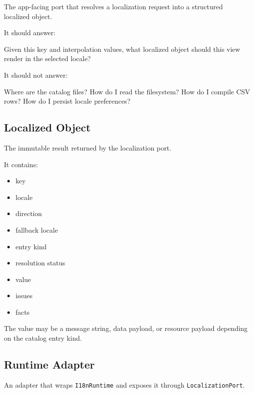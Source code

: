 The app-facing port that resolves a localization request into a structured localized object.

It should answer:

\begin{CodeBlock}
Given this key and interpolation values, what localized object should this view
render in the selected locale?
\end{CodeBlock}

It should not answer:

\begin{CodeBlock}
Where are the catalog files?
How do I read the filesystem?
How do I compile CSV rows?
How do I persist locale preferences?
\end{CodeBlock}

\subsection{Localized Object}\label{record-195-localized-object}

The immutable result returned by the localization port.

It contains:

\begin{itemize}
\tightlist
\item
  key
\item
  locale
\item
  direction
\item
  fallback locale
\item
  entry kind
\item
  resolution status
\item
  value
\item
  issues
\item
  facts
\end{itemize}

The value may be a message string, data payload, or resource payload depending on the catalog entry kind.

\subsection{Runtime Adapter}\label{record-195-runtime-adapter}

An adapter that wraps \texttt{I\allowbreak{}1\allowbreak{}8\allowbreak{}n\allowbreak{}R\allowbreak{}u\allowbreak{}n\allowbreak{}t\allowbreak{}i\allowbreak{}m\allowbreak{}e} and exposes it through \texttt{L\allowbreak{}o\allowbreak{}c\allowbreak{}a\allowbreak{}l\allowbreak{}i\allowbreak{}z\allowbreak{}a\allowbreak{}t\allowbreak{}i\allowbreak{}o\allowbreak{}n\allowbreak{}P\allowbreak{}o\allowbreak{}r\allowbreak{}t}.

